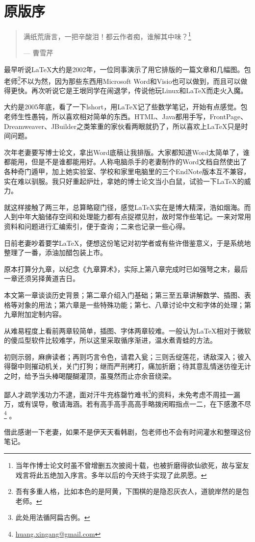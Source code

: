 \chapter{原版序}

\begin{quotation}
满纸荒唐言，一把辛酸泪！都云作者痴，谁解其中味？\footnote{当年作博士论文时虽不曾增删五次披阅十载，也被折磨得欲仙欲死，故与室友戏言将此五绝加入序言。多年以后的今天终于实现了此夙愿。}
\begin{flushright}
    --- 曹雪芹
\end{flushright}
\end{quotation}

最早听说\LaTeX{}大约是2002年，一位同事演示了用它排版的一篇文章和几幅图。包老师\footnote{吾有多重人格，比如本色的是阿黄，下围棋的是隐忍灰衣人，道貌岸然的是包老师。}不以为然，因为那些东西用Microsoft Word和Visio也可以做到，而且可以做得更快。再次听说它是王垠同学在闹退学，传说他玩Linux和\LaTeX{}而走火入魔。

大约是2005年底，看了一下lshort，用\LaTeX{}记了些数学笔记，开始有点感觉。包老师生性愚钝，所以喜欢相对简单的东西。HTML、Java都用手写，FrontPage、Dreamweaver、JBuilder之类笨重的家伙看两眼就扔了，所以喜欢上\LaTeX{}只是时间问题。

次年老妻要写博士论文，拿出Word底稿让我排版。大家都知道Word太简单了，谁都能用，但是不是谁都能用好。人称电脑杀手的老妻制作的Word文档自然使出了各种奇门遁甲，加上她实验室、学校和家里电脑里的三个EndNote版本互不兼容，实在难以驯服。我只好重起炉灶，拿她的博士论文当小白鼠，试验一下\LaTeX{}的威力。

就这样接触了两三年，总算略窥门径，感觉\LaTeX{}实在是博大精深，浩如烟海。而人到中年大脑储存空间和处理能力都有点捉襟见肘，故时常作些笔记。一来对常用资料和问题进行汇编索引，便于查询；二来也记录一些心得。

日前老妻吵着要学\LaTeX{}，便想这份笔记对初学者或有些许借鉴意义，于是系统地整理了一番，添油加醋包装上市。

原本打算分九章，以纪念《九章算术》，实际上第八章完成时已如强弩之末，最后一章还须另择黄道吉日。

本文第一章谈谈历史背景；第二章介绍入门基础；第三至五章讲解数学、插图、表格等对象的用法；第六章是一些特殊功能；第七、八章讨论中文和字体的处理；第九章附加定制内容。

从难易程度上看前两章较简单，插图、字体两章较难。一般认为\LaTeX{}相对于微软的傻瓜型软件比较难学，所以这里采取循序渐进，温水煮青蛙的方法。

初则示弱，麻痹读者；再则巧言令色，请君入瓮；三则舌绽莲花，诱敌深入；彼入得罄中则摧动机关，关门打狗；继而严刑拷打，痛加折磨；待其意乱情迷彷徨无计之时，给予当头棒喝醍醐灌顶，虽戛然而止亦余音绕梁。

鄙人才疏学浅功力不逮，面对汗牛充栋罄竹难书\footnote{此处用法循阿扁古例。}的资料，未免考虑不周挂一漏万，或有误导，敬请海涵。若有高手高手高高手略拨闲暇指点一二，在下感激不尽\footnote{\href{mailto:huang.xingang@gmail.com}{huang.xingang@gmail.com}}
。

借此感谢一下老妻，如果不是伊天天看韩剧，包老师也不会有时间灌水和整理这份笔记。
